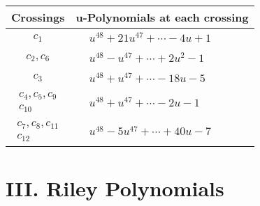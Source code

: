 \documentclass[1p]{elsarticle_modified}
\theoremstyle{definition}
\begin{document}
\begin{tabular}{m{50pt}|m{274pt}}
Crossings & \hspace{64pt}u-Polynomials at each crossing \\
\hline $$\begin{aligned}c_{1}\end{aligned}$$&$\begin{aligned}
&u^{48}+21 u^{47}+\cdots-4 u+1
\end{aligned}$\\
\hline $$\begin{aligned}c_{2},c_{6}\end{aligned}$$&$\begin{aligned}
&u^{48}- u^{47}+\cdots+2 u^2-1
\end{aligned}$\\
\hline $$\begin{aligned}c_{3}\end{aligned}$$&$\begin{aligned}
&u^{48}+u^{47}+\cdots-18 u-5
\end{aligned}$\\
\hline $$\begin{aligned}c_{4},c_{5},c_{9}\\c_{10}\end{aligned}$$&$\begin{aligned}
&u^{48}+u^{47}+\cdots-2 u-1
\end{aligned}$\\
\hline $$\begin{aligned}c_{7},c_{8},c_{11}\\c_{12}\end{aligned}$$&$\begin{aligned}
&u^{48}-5 u^{47}+\cdots+40 u-7
\end{aligned}$\\
\hline
\end{tabular}\newpage\renewcommand{\arraystretch}{1}
\centering \section*{ III. Riley Polynomials}
\end{document}

